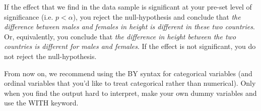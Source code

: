 \documentclass[]{book}\usepackage[]{graphicx}\usepackage[]{color}
\begin{document}
If the effect that we find in the data sample is significant at your pre-set level of significance (i.e. $p < \alpha$), you reject the null-hypothesis and conclude that \textit{the difference between males and females in height is different in these two countries}. Or, equivalently, you conclude that \textit{the difference in height between the two countries is different for males and females}. If the effect is not significant, you do not reject the null-hypothesis.

From now on, we recommend using the BY syntax for categorical variables (and ordinal variables that you'd like to treat categorical rather than numerical). Only when you find the output hard to interpret, make your own dummy variables and use the WITH keyword.





\end{document}
